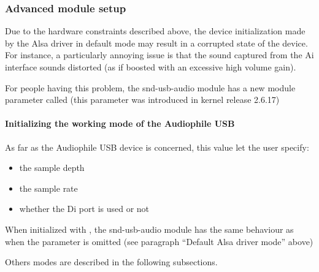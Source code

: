 \documentclass[a4paper,8pt,english]{sphinxmanual}
\begin{document}
\subsubsection{Advanced module setup}
\label{sound/cards/audiophile-usb:advanced-module-setup}
Due to the hardware constraints described above, the device initialization made
by the Alsa driver in default mode may result in a corrupted state of the
device. For instance, a particularly annoying issue is that the sound captured
from the Ai interface sounds distorted (as if boosted with an excessive high
volume gain).

For people having this problem, the snd-usb-audio module has a new module
parameter called  (this parameter was introduced in kernel
release 2.6.17)


\paragraph{Initializing the working mode of the Audiophile USB}
\label{sound/cards/audiophile-usb:initializing-the-working-mode-of-the-audiophile-usb}
As far as the Audiophile USB device is concerned, this value let the user
specify:
\begin{itemize}
\item {} 
the sample depth

\item {} 
the sample rate

\item {} 
whether the Di port is used or not

\end{itemize}

When initialized with , the snd-usb-audio module has
the same behaviour as when the parameter is omitted (see paragraph ``Default
Alsa driver mode'' above)

Others modes are described in the following subsections.
\end{document}

